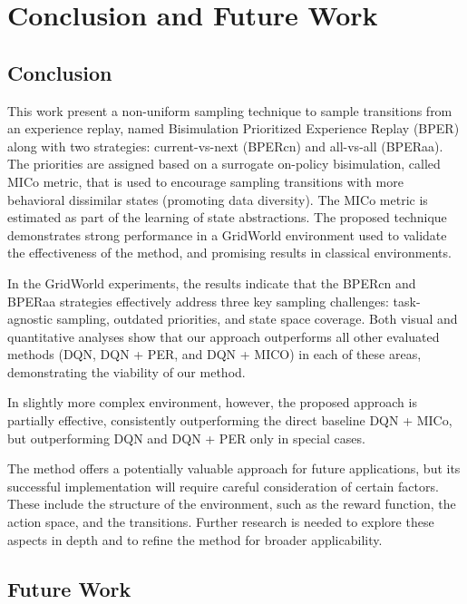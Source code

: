 
\chapter{Conclusion and Future Work}
\label{sec:conclusion_future_work}

\section{Conclusion}
This work present a non-uniform sampling technique to sample transitions from an experience replay, named Bisimulation Prioritized Experience Replay (BPER) along with two strategies: current-vs-next (BPERcn) and all-vs-all (BPERaa). The priorities are assigned based on a surrogate on-policy bisimulation, called MICo metric, that is used to encourage sampling transitions with more behavioral dissimilar states (promoting data diversity). The MICo metric is estimated as part of the learning of state abstractions. The proposed technique demonstrates strong performance in a GridWorld environment used to validate the effectiveness of the method, and promising results in classical environments.

In the GridWorld experiments, the results indicate that the BPERcn and BPERaa strategies effectively address three key sampling challenges: task-agnostic sampling, outdated priorities, and state space coverage. Both visual and quantitative analyses show that our approach outperforms all other evaluated methods (DQN, DQN + PER, and DQN + MICO) in each of these areas, demonstrating the viability of our method.

In slightly more complex environment, however, the proposed approach is partially effective, consistently outperforming the direct baseline DQN + MICo, but outperforming DQN and DQN + PER only in special cases.

The method offers a potentially valuable approach for future applications, but its successful implementation will require careful consideration of certain factors. These include the structure of the environment, such as the reward function, the action space, and the transitions. Further research is needed to explore these aspects in depth and to refine the method for broader applicability.

\section{Future Work}

